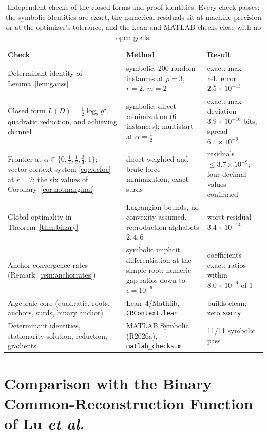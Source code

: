 ﻿\documentclass[11pt,onecolumn]{IEEEtran}
\begin{document}
\begin{table}[!t]
\caption{Independent checks of the closed forms and proof identities.
Every check passes: the symbolic identities are exact, the numerical
residuals sit at machine precision or at the optimizer's tolerance, and
the Lean and MATLAB checks close with no open goals.}
\label{tab:numver}
\centering
\footnotesize
\begin{tabular}{p{2.35in}p{1.75in}p{1.55in}}
\hline
Check & Method & Result\\
\hline
Determinant identity of Lemma~\ref{lem:gauss} & symbolic; 200 random
instances at $p{=}3$, $r{=}2$, $m{=}2$ & exact; max rel.\ error
$2.5\times10^{-13}$\\
Closed form $L(D)=\tfrac12\log_2 g^\star$, quadratic reduction, and
achieving channel & symbolic; direct minimization (6 instances);
multistart at $\alpha=\tfrac12$ & exact; max deviation
$3.9\times10^{-16}$ bits; spread $6.1\times10^{-9}$\\
Frontier at $\alpha\in\{0,\tfrac14,\tfrac12,\tfrac34,1\}$;
vector-context system \eqref{eq:vecfoc} at $r=2$; the six values of
Corollary~\ref{cor:notmarginal} & direct weighted and brute-force
minimization; exact surds & residuals $\le3.7\times10^{-9}$;
four-decimal values confirmed\\
Global optimality in Theorem~\ref{thm:binary} & Lagrangian bounds, no
convexity assumed, reproduction alphabets $2,4,6$ & worst residual
$3.4\times10^{-14}$\\
Anchor convergence rates (Remark~\ref{rem:anchorrates}) & symbolic
implicit differentiation at the simple root; numeric gap ratios down to
$\epsilon=10^{-6}$ & coefficients exact; ratios within
$8.0\times10^{-4}$ of $1$\\
Algebraic core (quadratic, roots, anchors, surds, binary anchor) &
Lean~4/Mathlib, \texttt{CRContext.lean} & builds clean; zero
\texttt{sorry}\\
Determinant identities, stationarity solution, reduction, gradients &
MATLAB Symbolic (R2026a), \texttt{matlab\_checks.m} & 11/11 symbolic
pass\\
\hline
\end{tabular}
\end{table}

\section{Comparison with the Binary Common-Reconstruction Function of Lu \emph{et al.}}
\label{app:lucompare}
\end{document}
